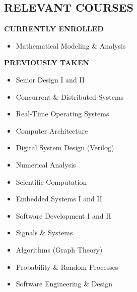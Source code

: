\documentclass[margin]{res}
\begin{document}
\begin{resume}
  \section{RELEVANT COURSES}
  \vspace{-.1em}
  {\footnotesize\textbf{CURRENTLY ENROLLED}}
  \vspace{-.875em}
  \begin{multicols}{2}
    \begin{itemize}
      \item Mathematical Modeling \& Analysis
    \end{itemize}
  \end{multicols}
  \vspace{-1.75em}
  {\footnotesize\textbf{PREVIOUSLY TAKEN}}
  \vspace{-.875em}
  \begin{multicols}{2}
    \begin{itemize}
    \item Senior Design I and II
    \item Concurrent \& Distributed Systems
    \item Real-Time Operating Systems
    \item Computer Architecture
    \item Digital System Design (Verilog)
    \item Numerical Analysis
    \item Scientific Computation
    \item Embedded Systems I and II
    \item Software Development I and II
    \item Signals \& Systems
    \item Algorithms (Graph Theory)
    \item Probability \& Random Processes
    \item Software Engineering \& Design
    \end{itemize}
  \end{multicols}


\end{resume}
\end{document}

